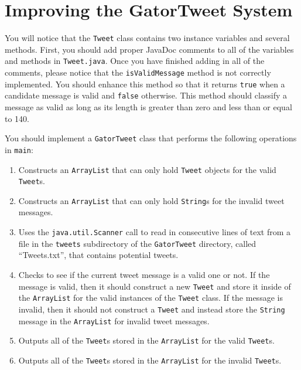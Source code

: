 \section*{Improving the GatorTweet System}

You will notice that the {\tt Tweet} class contains two instance variables and several methods.  First, you should add proper
JavaDoc comments to all of the variables and methods in {\tt Tweet.java}.  Once you have finished adding in all of the comments,
please notice that the {\tt isValidMessage} method is not correctly implemented.  You should enhance this method so that it
returns {\tt true} when a candidate message is valid and {\tt false} otherwise.  This method should classify a message as valid as
long as its length is greater than zero and less than or equal to 140.


You should implement a {\tt GatorTweet} class that performs the following operations in {\tt main}:

\vspace*{-.1in}
\begin{enumerate}
  \item Constructs an {\tt ArrayList} that can only hold {\tt Tweet} objects for the valid {\tt Tweet}s.
  
  \item Constructs an {\tt ArrayList} that can only hold {\tt String}s for the invalid tweet messages.
  
  \item Uses the {\tt java.util.Scanner} call to read in consecutive lines of text from a file in the {\tt tweets} subdirectory of
    the {\tt GatorTweet} directory, called ``Tweets.txt'', that contains potential tweets.
  
  \item Checks to see if the current tweet message is a valid one or not.  If the message is valid, then it should construct a new
    {\tt Tweet} and store it inside of the {\tt ArrayList} for the valid instances of the {\tt Tweet} class.  If the message is
    invalid, then it should not construct a {\tt Tweet} and instead store the {\tt String} message in the {\tt ArrayList} for
    invalid tweet messages.

  \item Outputs all of the {\tt Tweet}s stored in the {\tt ArrayList} for the valid {\tt Tweet}s.

  \item Outputs all of the {\tt Tweet}s stored in the {\tt ArrayList} for the invalid {\tt Tweet}s.

\end{enumerate}


